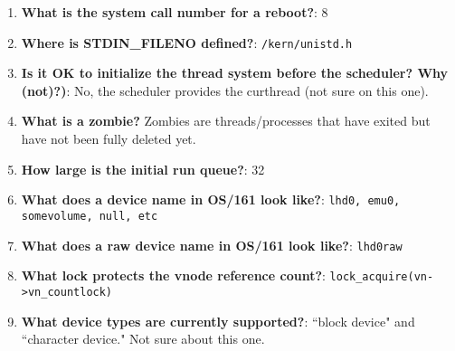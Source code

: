 \documentclass{article}
\begin{document}
\begin{enumerate}
\item
\textbf{What is the system call number for a reboot?}: 8
\item
\textbf{Where is STDIN\_FILENO defined?}: \texttt{/kern/unistd.h}
\item
\textbf{Is it OK to initialize the thread system before the scheduler? Why
(not)?)}: No, the scheduler provides the curthread (not sure on this one).
\item
\textbf{What is a zombie?} Zombies are threads/processes that have exited but
have not been fully deleted yet.
\item
\textbf{How large is the initial run queue?}: 32
\item
\textbf{What does a device name in OS/161 look like?}: \texttt{lhd0, emu0,
somevolume, null, etc}
\item
\textbf{What does a raw device name in OS/161 look like?}: \texttt{lhd0raw}
\item
\textbf{What lock protects the vnode reference count?}:
\texttt{lock\_acquire(vn->vn\_countlock)}
\item
\textbf{What device types are currently supported?}: ``block device" and
``character device." Not sure about this one.
\end{enumerate}
\end{document}

